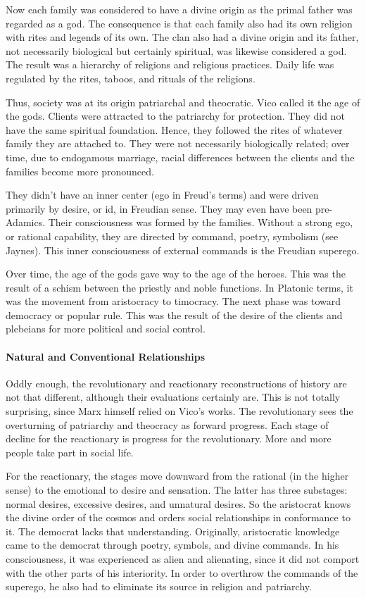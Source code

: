 Now each family was considered to have a divine origin as the primal father was regarded as a god. The consequence is that each family also had its own religion with rites and legends of its own. The clan also had a divine origin and its father, not necessarily biological but certainly spiritual, was likewise considered a god. The result was a hierarchy of religions and religious practices. Daily life was regulated by the rites, taboos, and rituals of the religions.

Thus, society was at its origin patriarchal and theocratic. Vico called it the age of the gods. Clients were attracted to the patriarchy for protection. They did not have the same spiritual foundation. Hence, they followed the rites of whatever family they are attached to. They were not necessarily biologically related; over time, due to endogamous marriage, racial differences between the clients and the families become more pronounced.

They didn't have an inner center (ego in Freud's terms) and were driven primarily by desire, or id, in Freudian sense. They may even have been pre-Adamics. Their consciousness was formed by the families. Without a strong ego, or rational capability, they are directed by command, poetry, symbolism (see Jaynes). This inner consciousness of external commands is the Freudian superego.

Over time, the age of the gods gave way to the age of the heroes. This was the result of a schism between the priestly and noble functions. In Platonic terms, it was the movement from aristocracy to timocracy. The next phase was toward democracy or popular rule. This was the result of the desire of the clients and plebeians for more political and social control.

\paragraph{Natural and Conventional Relationships}
Oddly enough, the revolutionary and reactionary reconstructions of history are not that different, although their evaluations certainly are. This is not totally surprising, since Marx himself relied on Vico's works. The revolutionary sees the overturning of patriarchy and theocracy as forward progress. Each stage of decline for the reactionary is progress for the revolutionary. More and more people take part in social life.

For the reactionary, the stages move downward from the rational (in the higher sense) to the emotional to desire and sensation. The latter has three substages: normal desires, excessive desires, and unnatural desires. So the aristocrat knows the divine order of the cosmos and orders social relationships in conformance to it. The democrat lacks that understanding. Originally, aristocratic knowledge came to the democrat through poetry, symbols, and divine commands. In his consciousness, it was experienced as alien and alienating, since it did not comport with the other parts of his interiority. In order to overthrow the commands of the superego, he also had to eliminate its source in religion and patriarchy.

